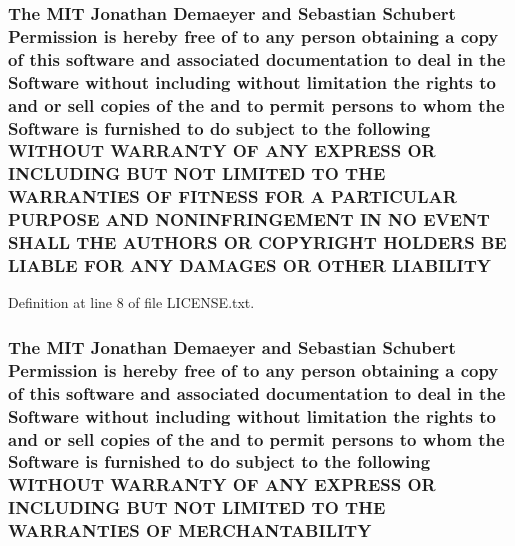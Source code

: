\subsubsection[{\texorpdfstring{L\+I\+A\+B\+I\+L\+I\+TY}{LIABILITY}}]{\setlength{\rightskip}{0pt plus 5cm}The M\+IT Jonathan Demaeyer and Sebastian Schubert Permission is hereby free of to any person obtaining a {\bf copy} of this software and associated documentation to deal in the {\bf Software} without including without limitation the rights to and or sell copies of the and to permit persons to whom the {\bf Software} is furnished to do subject to the following W\+I\+T\+H\+O\+UT W\+A\+R\+R\+A\+N\+TY OF A\+NY E\+X\+P\+R\+E\+SS OR I\+N\+C\+L\+U\+D\+I\+NG B\+UT N\+OT L\+I\+M\+I\+T\+ED TO T\+HE W\+A\+R\+R\+A\+N\+T\+I\+ES OF F\+I\+T\+N\+E\+SS F\+OR A P\+A\+R\+T\+I\+C\+U\+L\+AR P\+U\+R\+P\+O\+SE A\+ND N\+O\+N\+I\+N\+F\+R\+I\+N\+G\+E\+M\+E\+NT IN NO E\+V\+E\+NT S\+H\+A\+LL T\+HE A\+U\+T\+H\+O\+RS OR C\+O\+P\+Y\+R\+I\+G\+HT H\+O\+L\+D\+E\+RS BE L\+I\+A\+B\+LE F\+OR A\+NY D\+A\+M\+A\+G\+ES OR O\+T\+H\+ER L\+I\+A\+B\+I\+L\+I\+TY}\hypertarget{LICENSE_8txt_ad31e61c61cdb35ab358c01b9b3ef9ce1}{}\label{LICENSE_8txt_ad31e61c61cdb35ab358c01b9b3ef9ce1}


Definition at line 8 of file L\+I\+C\+E\+N\+S\+E.\+txt.

\subsubsection[{\texorpdfstring{M\+E\+R\+C\+H\+A\+N\+T\+A\+B\+I\+L\+I\+TY}{MERCHANTABILITY}}]{\setlength{\rightskip}{0pt plus 5cm}The M\+IT Jonathan Demaeyer and Sebastian Schubert Permission is hereby free of to any person obtaining a {\bf copy} of this software and associated documentation to deal in the {\bf Software} without including without limitation the rights to and or sell copies of the and to permit persons to whom the {\bf Software} is furnished to do subject to the following W\+I\+T\+H\+O\+UT W\+A\+R\+R\+A\+N\+TY OF A\+NY E\+X\+P\+R\+E\+SS OR I\+N\+C\+L\+U\+D\+I\+NG B\+UT N\+OT L\+I\+M\+I\+T\+ED TO T\+HE W\+A\+R\+R\+A\+N\+T\+I\+ES OF M\+E\+R\+C\+H\+A\+N\+T\+A\+B\+I\+L\+I\+TY}\hypertarget{LICENSE_8txt_ad268e4ad5bd7d8de506e602441be0b04}{}\label{LICENSE_8txt_ad268e4ad5bd7d8de506e602441be0b04}


